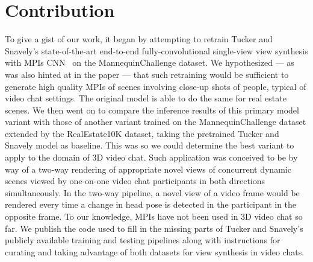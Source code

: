 \section{Contribution}\label{sec:contribution} 

To give a gist of our work, it began by attempting to retrain Tucker and Snavely's state-of-the-art end-to-end fully-convolutional single-view view synthesis with MPIs CNN~\cite{single_view_mpi} on the MannequinChallenge dataset. We hypothesized --- as was also hinted at in the paper --- that such retraining would be sufficient to generate high quality MPIs of scenes involving close-up shots of people, typical of video chat settings. The original model is able to do the same for real estate scenes. We then went on to compare the inference results of this primary model variant with those of another variant trained on the MannequinChallenge dataset extended by the RealEstate10K dataset, taking the pretrained Tucker and Snavely model as baseline. This was so we could determine the best variant to apply to the domain of 3D video chat. Such application was conceived to be by way of a two-way rendering of appropriate novel views of concurrent dynamic scenes viewed by one-on-one video chat participants in both directions simultaneously. In the two-way pipeline, a novel view of a video frame would be rendered every time a change in head pose is detected in the participant in the opposite frame. To our knowledge, MPIs have not been used in 3D video chat so far. We publish the code used to fill in the missing parts of Tucker and Snavely's publicly available training and testing pipelines along with instructions for curating and taking advantage of both datasets for view synthesis in video chats.
